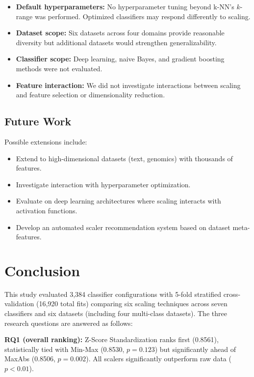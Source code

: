 \documentclass[12pt,a4paper]{article}
\begin{document}
\begin{itemize}
  \item \textbf{Default hyperparameters:} No hyperparameter tuning beyond k-NN's $k$-range was performed. Optimized classifiers may respond differently to scaling.
  \item \textbf{Dataset scope:} Six datasets across four domains provide reasonable diversity but additional datasets would strengthen generalizability.
  \item \textbf{Classifier scope:} Deep learning, naive Bayes, and gradient boosting methods were not evaluated.
  \item \textbf{Feature interaction:} We did not investigate interactions between scaling and feature selection or dimensionality reduction.
\end{itemize}

\subsection{Future Work}
\label{sec:future}

Possible extensions include:
\begin{itemize}
  \item Extend to high-dimensional datasets (text, genomics) with thousands of features.
  \item Investigate interaction with hyperparameter optimization.
  \item Evaluate on deep learning architectures where scaling interacts with activation functions.
  \item Develop an automated scaler recommendation system based on dataset meta-features.
\end{itemize}

\section{Conclusion}
\label{sec:conclusion}

This study evaluated 3,384 classifier configurations with 5-fold stratified cross-validation (16,920 total fits) comparing six scaling techniques across seven classifiers and six datasets (including four multi-class datasets). The three research questions are answered as follows:

\textbf{RQ1 (overall ranking):} Z-Score Standardization ranks first (0.8561), statistically tied with Min-Max (0.8530, $p=0.123$) but significantly ahead of MaxAbs (0.8506, $p=0.002$). All scalers significantly outperform raw data ($p<0.01$).
\end{document}
